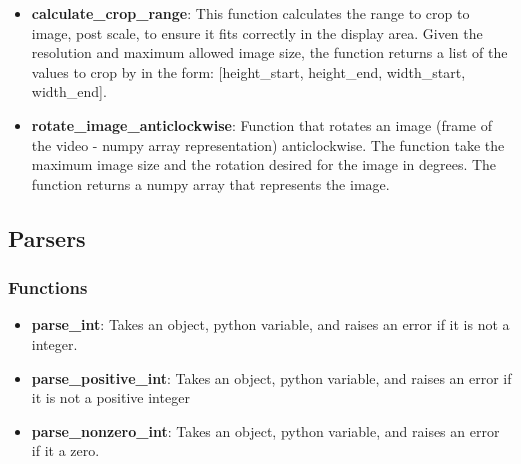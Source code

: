 \documentclass{article}
\begin{document}
\begin{itemize}
	\item \textbf{calculate\_crop\_range}: This function calculates the range to crop to image, post scale, to ensure it fits correctly in the display area. Given the resolution and maximum allowed image size, the function returns a list of the values to crop by in the form: [height\_start, height\_end, width\_start, width\_end].
	
	\item \textbf{rotate\_image\_anticlockwise}: Function that rotates an image (frame of the video - numpy array representation) anticlockwise. The function take the maximum image size and the rotation desired for the image in degrees. The function returns a numpy array that represents the image. 

\end{itemize}

\subsection{Parsers}
\subsubsection{Functions}
\begin{itemize}
	\item \textbf{parse\_int}: Takes an object, python variable, and raises an error if it is not a integer. 	
	
	\item \textbf{parse\_positive\_int}: Takes an object, python variable, and raises an error if it is not a positive integer

	\item \textbf{parse\_nonzero\_int}: Takes an object, python variable, and raises an error if it a zero.
	
\end{itemize}
\end{document}
